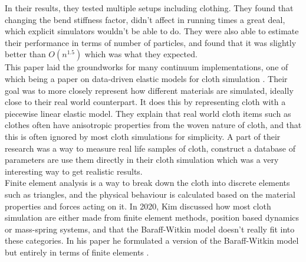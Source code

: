 \documentclass[12pt,a4paper]{article}
\begin{document}
In their results, they tested multiple setups including clothing. They found that changing the bend stiffness factor, didn't affect in running times a great deal, which explicit simulators wouldn't be able to do. They were also able to estimate their performance in terms of number of particles, and found that it was slightly better than \(O(n^{1.5})\) which was what they expected.\\

This paper laid the groundworks for many continuum implementations, one of which being a paper on data-driven elastic models for cloth simulation \cite{wangdatadriven}. Their goal was to more closely represent how different materials are simulated, ideally close to their real world counterpart. It does this by representing cloth with a piecewise linear elastic model. They explain that real world cloth items such as clothes often have anisotropic properties from the woven nature of cloth, and that this is often ignored by most cloth simulations for simplicity. A part of their research was a way to measure real life samples of cloth, construct a database of parameters are use them directly in their cloth simulation which was a very interesting way to get realistic results.
\\

Finite element analysis is a way to break down the cloth into discrete elements such as triangles, and the physical behaviour is calculated based on the material properties and forces acting on it. In 2020, Kim discussed how most cloth simulation are either made from finite element methods, position based dynamics or mass-spring systems, and that the Baraff-Witkin model doesn't really fit into these categories. In his paper he formulated a version of the Baraff-Witkin model but entirely in terms of finite elements \cite{FEMcantunderstand}. \\ 
\end{document}
